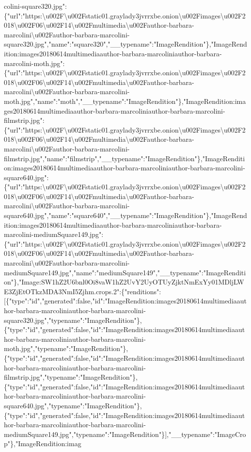 colini-square320.jpg":\{"url":"https:\textbackslash{}u002F\textbackslash{}u002Fstatic01.graylady3jvrrxbe.onion\textbackslash{}u002Fimages\textbackslash{}u002F2018\textbackslash{}u002F06\textbackslash{}u002F14\textbackslash{}u002Fmultimedia\textbackslash{}u002Fauthor-barbara-marcolini\textbackslash{}u002Fauthor-barbara-marcolini-square320.jpg","name":"square320","\_\_typename":"ImageRendition"\},"ImageRendition:images20180614multimediaauthor-barbara-marcoliniauthor-barbara-marcolini-moth.jpg":\{"url":"https:\textbackslash{}u002F\textbackslash{}u002Fstatic01.graylady3jvrrxbe.onion\textbackslash{}u002Fimages\textbackslash{}u002F2018\textbackslash{}u002F06\textbackslash{}u002F14\textbackslash{}u002Fmultimedia\textbackslash{}u002Fauthor-barbara-marcolini\textbackslash{}u002Fauthor-barbara-marcolini-moth.jpg","name":"moth","\_\_typename":"ImageRendition"\},"ImageRendition:images20180614multimediaauthor-barbara-marcoliniauthor-barbara-marcolini-filmstrip.jpg":\{"url":"https:\textbackslash{}u002F\textbackslash{}u002Fstatic01.graylady3jvrrxbe.onion\textbackslash{}u002Fimages\textbackslash{}u002F2018\textbackslash{}u002F06\textbackslash{}u002F14\textbackslash{}u002Fmultimedia\textbackslash{}u002Fauthor-barbara-marcolini\textbackslash{}u002Fauthor-barbara-marcolini-filmstrip.jpg","name":"filmstrip","\_\_typename":"ImageRendition"\},"ImageRendition:images20180614multimediaauthor-barbara-marcoliniauthor-barbara-marcolini-square640.jpg":\{"url":"https:\textbackslash{}u002F\textbackslash{}u002Fstatic01.graylady3jvrrxbe.onion\textbackslash{}u002Fimages\textbackslash{}u002F2018\textbackslash{}u002F06\textbackslash{}u002F14\textbackslash{}u002Fmultimedia\textbackslash{}u002Fauthor-barbara-marcolini\textbackslash{}u002Fauthor-barbara-marcolini-square640.jpg","name":"square640","\_\_typename":"ImageRendition"\},"ImageRendition:images20180614multimediaauthor-barbara-marcoliniauthor-barbara-marcolini-mediumSquare149.jpg":\{"url":"https:\textbackslash{}u002F\textbackslash{}u002Fstatic01.graylady3jvrrxbe.onion\textbackslash{}u002Fimages\textbackslash{}u002F2018\textbackslash{}u002F06\textbackslash{}u002F14\textbackslash{}u002Fmultimedia\textbackslash{}u002Fauthor-barbara-marcolini\textbackslash{}u002Fauthor-barbara-marcolini-mediumSquare149.jpg","name":"mediumSquare149","\_\_typename":"ImageRendition"\},"Image:SW1hZ2U6bnl0Oi8vaW1hZ2UvY2UyOTUyZjktNmExYy01MDljLWE3ZjEtOTkzMDA3NmI5Zjhm.crops.2":\{"renditions":{[}\{"type":"id","generated":false,"id":"ImageRendition:images20180614multimediaauthor-barbara-marcoliniauthor-barbara-marcolini-square320.jpg","typename":"ImageRendition"\},\{"type":"id","generated":false,"id":"ImageRendition:images20180614multimediaauthor-barbara-marcoliniauthor-barbara-marcolini-moth.jpg","typename":"ImageRendition"\},\{"type":"id","generated":false,"id":"ImageRendition:images20180614multimediaauthor-barbara-marcoliniauthor-barbara-marcolini-filmstrip.jpg","typename":"ImageRendition"\},\{"type":"id","generated":false,"id":"ImageRendition:images20180614multimediaauthor-barbara-marcoliniauthor-barbara-marcolini-square640.jpg","typename":"ImageRendition"\},\{"type":"id","generated":false,"id":"ImageRendition:images20180614multimediaauthor-barbara-marcoliniauthor-barbara-marcolini-mediumSquare149.jpg","typename":"ImageRendition"\}{]},"\_\_typename":"ImageCrop"\},"ImageRendition:imag